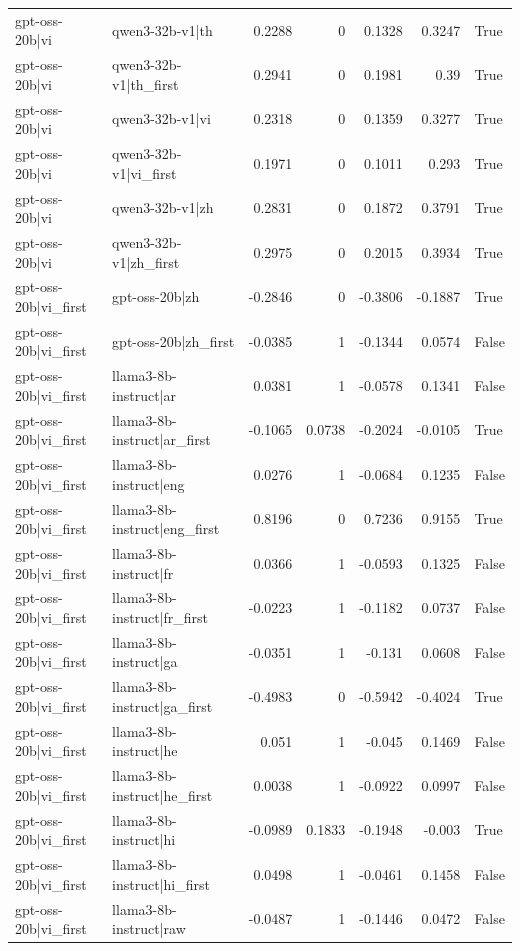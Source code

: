 \begin{table}
\begin{tabular}{l l r r r r l}
gpt-oss-20b|vi & qwen3-32b-v1|th & 0.2288 & 0 & 0.1328 & 0.3247 & True \\
gpt-oss-20b|vi & qwen3-32b-v1|th_first & 0.2941 & 0 & 0.1981 & 0.39 & True \\
gpt-oss-20b|vi & qwen3-32b-v1|vi & 0.2318 & 0 & 0.1359 & 0.3277 & True \\
gpt-oss-20b|vi & qwen3-32b-v1|vi_first & 0.1971 & 0 & 0.1011 & 0.293 & True \\
gpt-oss-20b|vi & qwen3-32b-v1|zh & 0.2831 & 0 & 0.1872 & 0.3791 & True \\
gpt-oss-20b|vi & qwen3-32b-v1|zh_first & 0.2975 & 0 & 0.2015 & 0.3934 & True \\
gpt-oss-20b|vi_first & gpt-oss-20b|zh & -0.2846 & 0 & -0.3806 & -0.1887 & True \\
gpt-oss-20b|vi_first & gpt-oss-20b|zh_first & -0.0385 & 1 & -0.1344 & 0.0574 & False \\
gpt-oss-20b|vi_first & llama3-8b-instruct|ar & 0.0381 & 1 & -0.0578 & 0.1341 & False \\
gpt-oss-20b|vi_first & llama3-8b-instruct|ar_first & -0.1065 & 0.0738 & -0.2024 & -0.0105 & True \\
gpt-oss-20b|vi_first & llama3-8b-instruct|eng & 0.0276 & 1 & -0.0684 & 0.1235 & False \\
gpt-oss-20b|vi_first & llama3-8b-instruct|eng_first & 0.8196 & 0 & 0.7236 & 0.9155 & True \\
gpt-oss-20b|vi_first & llama3-8b-instruct|fr & 0.0366 & 1 & -0.0593 & 0.1325 & False \\
gpt-oss-20b|vi_first & llama3-8b-instruct|fr_first & -0.0223 & 1 & -0.1182 & 0.0737 & False \\
gpt-oss-20b|vi_first & llama3-8b-instruct|ga & -0.0351 & 1 & -0.131 & 0.0608 & False \\
gpt-oss-20b|vi_first & llama3-8b-instruct|ga_first & -0.4983 & 0 & -0.5942 & -0.4024 & True \\
gpt-oss-20b|vi_first & llama3-8b-instruct|he & 0.051 & 1 & -0.045 & 0.1469 & False \\
gpt-oss-20b|vi_first & llama3-8b-instruct|he_first & 0.0038 & 1 & -0.0922 & 0.0997 & False \\
gpt-oss-20b|vi_first & llama3-8b-instruct|hi & -0.0989 & 0.1833 & -0.1948 & -0.003 & True \\
gpt-oss-20b|vi_first & llama3-8b-instruct|hi_first & 0.0498 & 1 & -0.0461 & 0.1458 & False \\
gpt-oss-20b|vi_first & llama3-8b-instruct|raw & -0.0487 & 1 & -0.1446 & 0.0472 & False \\

\end{tabular}
\end{table}
